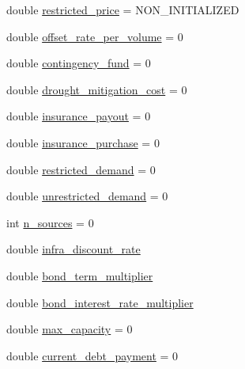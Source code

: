 \begin{DoxyCompactItemize}
\item 
double \mbox{\hyperlink{classUtility_ad8c81bed9c3f3978a669f1259845b228_ad8c81bed9c3f3978a669f1259845b228}{restricted\+\_\+price}} = N\+O\+N\+\_\+\+I\+N\+I\+T\+I\+A\+L\+I\+Z\+ED
\item 
double \mbox{\hyperlink{classUtility_a82c8cf50e20ab43c6b99d602b3d5d3c8_a82c8cf50e20ab43c6b99d602b3d5d3c8}{offset\+\_\+rate\+\_\+per\+\_\+volume}} = 0
\item 
double \mbox{\hyperlink{classUtility_a24ac3a2a8609d922cbf99292a9ea40e6_a24ac3a2a8609d922cbf99292a9ea40e6}{contingency\+\_\+fund}} = 0
\item 
double \mbox{\hyperlink{classUtility_aec75cb2903dc25aa2743b9a8cf1271da_aec75cb2903dc25aa2743b9a8cf1271da}{drought\+\_\+mitigation\+\_\+cost}} = 0
\item 
double \mbox{\hyperlink{classUtility_a833681a1110eca06030e8cca742708fb_a833681a1110eca06030e8cca742708fb}{insurance\+\_\+payout}} = 0
\item 
double \mbox{\hyperlink{classUtility_a16b9ac7474fb956679a5a6be82efdf46_a16b9ac7474fb956679a5a6be82efdf46}{insurance\+\_\+purchase}} = 0
\item 
double \mbox{\hyperlink{classUtility_aa78701b34a33088dfe3677eca579617e_aa78701b34a33088dfe3677eca579617e}{restricted\+\_\+demand}} = 0
\item 
double \mbox{\hyperlink{classUtility_a5f981ceeba0b50298b5ad2d463bf4f40_a5f981ceeba0b50298b5ad2d463bf4f40}{unrestricted\+\_\+demand}} = 0
\item 
int \mbox{\hyperlink{classUtility_ac8ca6a82c340f78c539302dc87832a6e_ac8ca6a82c340f78c539302dc87832a6e}{n\+\_\+sources}} = 0
\item 
double \mbox{\hyperlink{classUtility_a30d506af7125857c7b386f65b10c6d48_a30d506af7125857c7b386f65b10c6d48}{infra\+\_\+discount\+\_\+rate}}
\item 
double \mbox{\hyperlink{classUtility_a033a19d7bc53d5b879c8b10b159dc6a9_a033a19d7bc53d5b879c8b10b159dc6a9}{bond\+\_\+term\+\_\+multiplier}}
\item 
double \mbox{\hyperlink{classUtility_aea57a6180aacea15cb9485c455f9c48e_aea57a6180aacea15cb9485c455f9c48e}{bond\+\_\+interest\+\_\+rate\+\_\+multiplier}}
\item 
double \mbox{\hyperlink{classUtility_aa84826c0ff6f1a9836f52316a4e7e0cd_aa84826c0ff6f1a9836f52316a4e7e0cd}{max\+\_\+capacity}} = 0
\item 
double \mbox{\hyperlink{classUtility_a74b8caabf26e3bbf87871514b0ad7ee1_a74b8caabf26e3bbf87871514b0ad7ee1}{current\+\_\+debt\+\_\+payment}} = 0

\end{DoxyCompactItemize}
